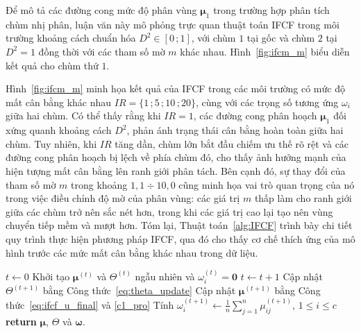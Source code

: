 \documentclass[a4paper,oneside]{book} %
\theoremstyle{plain}
\theoremstyle{plain}
\theoremstyle{nonumberplain}
\begin{document}
Để mô tả các đường cong mức độ phân vùng $\bm \mu_1$ trong trường hợp phân tích chùm nhị phân, luận văn này mô phỏng trực quan thuật toán IFCF trong môi trường khoảng cách chuẩn hóa $D^2\in[0\,;1]$, với chùm $1$ tại gốc và chùm $2$ tại $D^2=1$ đồng thời với các tham số mờ $m$ khác nhau. Hình~\ref{fig:ifcm_m} biểu diễn kết quả cho chùm thứ $1$.

Hình~\ref{fig:ifcm_m} minh họa kết quả của IFCF trong các môi trường có mức độ mất cân bằng khác nhau $IR=\{1\,;5\,;10\,;20\}$, cùng với các trọng số tương ứng $\omega_i$ giữa hai chùm. Có thể thấy rằng khi $IR=1$, các đường cong phân hoạch $\bm\mu_1$ đối xứng quanh khoảng cách $D^2$, phản ánh trạng thái cân bằng hoàn toàn giữa hai chùm. 
Tuy nhiên, khi $IR$ tăng dần, chùm lớn bắt đầu chiếm ưu thế rõ rệt và các đường cong phân hoạch bị lệch về phía chùm đó, cho thấy ảnh hưởng mạnh của hiện tượng mất cân bằng lên ranh giới phân tách. Bên cạnh đó, sự thay đổi của tham số mờ $m$ trong khoảng $1{,}1\div10{,}0$ cũng minh họa vai trò quan trọng của nó trong việc điều chỉnh độ mờ của phân vùng: các giá trị $m$ thấp làm cho ranh giới giữa các chùm trở nên sắc nét hơn, trong khi các giá trị cao lại tạo nên vùng chuyển tiếp mềm và mượt hơn. Tóm lại, Thuật toán~\ref{alg:IFCF} trình bày chi tiết quy trình thực hiện phương pháp IFCF, qua đó cho thấy cơ chế thích ứng của mô hình trước các mức mất cân bằng khác nhau trong dữ liệu.


\begin{algorithm}[H]
	\caption{Giải thuật phân tích chùm mờ cải tiến (IFCF)}
	\label{alg:IFCF}
	\begin{algorithmic}[1]
		\State $t\gets0$
		\State Khởi tạo ${\bm\mu}^{(t)}$ và $\Theta^{(t)}$ ngẫu nhiên và $\omega_i^{(t)} = \bm 0$
		\State $t \gets t+1$
		\State Cập nhật $\Theta^{(t+1)}$ bằng Công thức~\eqref{eq:theta_update}
		\State Cập nhật ${\bm\mu}^{(t+1)}$ bằng Công thức~\eqref{eq:ifcf_u_final} và \eqref{c1_pro}
		\State Tính $\omega_i^{(t+1)} \gets \frac{1}{n}\sum_{j=1}^n \mu_{ij}^{(t+1)}$, \quad $1\le i\le c$
		\EndWhile
		\State \textbf{return} ${\bm\mu}$, $\Theta$ và $\bm\omega$.
		\EndProcedure
	\end{algorithmic}
\end{algorithm}
\end{document}
